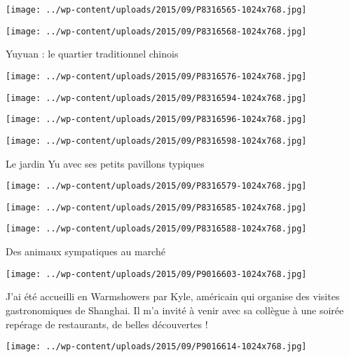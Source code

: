  \newline
\centerline{\texttt{[image: ../wp-content/uploads/2015/09/P8316565-1024x768.jpg]} } 
 \newline
 \newline
\centerline{\texttt{[image: ../wp-content/uploads/2015/09/P8316568-1024x768.jpg]} } 
 \newline
 Yuyuan : le quartier traditionnel chinois \newline
 \newline
\centerline{\texttt{[image: ../wp-content/uploads/2015/09/P8316576-1024x768.jpg]} } 
 \newline
 \newline
\centerline{\texttt{[image: ../wp-content/uploads/2015/09/P8316594-1024x768.jpg]} } 
 \newline
 \newline
\centerline{\texttt{[image: ../wp-content/uploads/2015/09/P8316596-1024x768.jpg]} } 
 \newline
 \newline
\centerline{\texttt{[image: ../wp-content/uploads/2015/09/P8316598-1024x768.jpg]} } 
 \newline
 Le jardin Yu avec ses petits pavillons typiques \newline
 \newline
\centerline{\texttt{[image: ../wp-content/uploads/2015/09/P8316579-1024x768.jpg]} } 
 \newline
 \newline
\centerline{\texttt{[image: ../wp-content/uploads/2015/09/P8316585-1024x768.jpg]} } 
 \newline
 \newline
\centerline{\texttt{[image: ../wp-content/uploads/2015/09/P8316588-1024x768.jpg]} } 
 \newline
 Des animaux sympatiques au marché \newline
 \newline
\centerline{\texttt{[image: ../wp-content/uploads/2015/09/P9016603-1024x768.jpg]} } 
 \newline
 J'ai été accueilli en Warmshowers par Kyle, américain qui organise des visites gastronomiques de Shanghai. Il m'a invité à venir avec sa collègue à une soirée repérage de restaurants, de belles découvertes ! \newline
 \newline
\centerline{\texttt{[image: ../wp-content/uploads/2015/09/P9016614-1024x768.jpg]} } 
